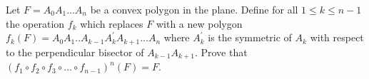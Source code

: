 Let $F=A_0A_1...A_n$ be a convex polygon in the plane. Define for all $1 \leq k \leq n-1$ the operation $f_k$ which replaces $F$ with a new polygon $f_k(F)=A_0A_1..A_{k-1}A_k^\prime A_{k+1}...A_n$ where $A_k^\prime$ is the symmetric of $A_k$ with respect to the perpendicular bisector of $A_{k-1}A_{k+1}$. Prove that $(f_1\circ f_2 \circ f_3 \circ...\circ f_{n-1})^n(F)=F$.